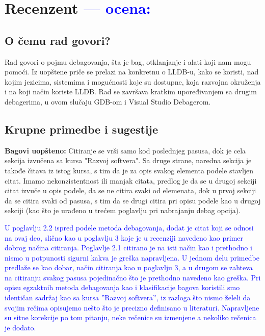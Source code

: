 \documentclass[a4paper]{report}
\newcommand{\odgovor}[1]{\textcolor{blue}{#1}}
\begin{document}
\chapter{Recenzent \odgovor{--- ocena:} }


\section{O čemu rad govori?}
Rad govori o pojmu debagovanja, šta je bag, otklanjanje i alati koji nam mogu pomoći. Iz uopštene priče se prelazi na konkretnu o LLDB-u, kako se koristi, nad kojim jezicima, sistemima i mogućnosti
koje su dostupne, koja razvojna okruženja i na koji način koriste LLDB. Rad se završava kratkim upoređivanjem sa drugim debagerima, u ovom slučaju GDB-om i Visual Studio Debagerom.

\section{Krupne primedbe i sugestije}
\textbf{Bagovi uopšteno:} Citiranje se vrši samo kod poslednjeg pasusa, dok je cela sekcija izvučena sa kursa "Razvoj softvera". Sa druge strane, naredna sekcija je takođe
čitava iz istog kursa, s tim da je za opis svakog elementa podele stavljen citat. Imamo nekonzistentnost ili manjak citata, predlog je da se u drugoj sekciji citat izvuče u opis podele,
da se ne citira svaki od elemenata, dok u prvoj sekciji da se citira svaki od pasusa, s tim da se drugi citira pri opisu podele kao u drugoj sekciji (kao što je urađeno u trećem poglavlju
pri nabrajanju debag opcija).

\odgovor{U poglavlju 2.2 ispred podele metoda debagovanja, dodat je citat koji se odnosi na ovaj deo, slično kao u poglavlju 3 koje je u recenziji navedeno kao primer dobrog načina citiranja. Poglavlje 2.1 citirano je na isti način kao i prethodno i nismo u potpunosti sigurni kakva je greška napravljena. U jednom delu primedbe predlaže se kao dobar, način citiranja kao u poglavlju 3, a u drugom se zahteva na citiranju svakog pasusa pojedinačno što je prethodno navedeno kao greška. Pri opisu egzaktnih metoda debagovanja kao i klasifikacije bagova koristili smo identičan sadržaj kao sa kursa ''Razvoj softvera'', iz razloga što nismo želeli da svojim rečima opisujemo nešto što je precizno definisano u literaturi. Napravljene su sitne korekcije po tom pitanju, neke rečenice su izmenjene a nekoliko rečenica je dodato.}
\end{document}
